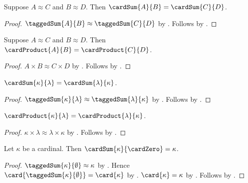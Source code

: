 \begin{proposition}\label{cardinal_sum_congruent}
    Suppose $A\approx C$ and $B\approx D$.
    Then $\cardSum{A}{B}=\cardSum{C}{D}$.
\end{proposition}
\begin{proof}
    $\taggedSum{A}{B}\approx\taggedSum{C}{D}$
        by .
    Follows by .
\end{proof}

\begin{proposition}\label{cardinal_product_congruent}
    Suppose $A\approx C$ and $B\approx D$.
    Then $\cardProduct{A}{B}=\cardProduct{C}{D}$.
\end{proposition}
\begin{proof}
    $A\times B\approx C\times D$ by .
    Follows by .
\end{proof}

\begin{proposition}\label{cardinal_sum_commutative}
    $\cardSum{\kappa}{\lambda}=\cardSum{\lambda}{\kappa}$.
\end{proposition}
\begin{proof}
    $\taggedSum{\kappa}{\lambda}\approx\taggedSum{\lambda}{\kappa}$
        by .
    Follows by .
\end{proof}

\begin{proposition}\label{cardinal_product_commutative}
    $\cardProduct{\kappa}{\lambda}=\cardProduct{\lambda}{\kappa}$.
\end{proposition}
\begin{proof}
    $\kappa\times\lambda\approx\lambda\times\kappa$
        by .
    Follows by .
\end{proof}

\begin{proposition}\label{cardinal_sum_zero_right}
    Let $\kappa$ be a cardinal.
    Then $\cardSum{\kappa}{\cardZero}=\kappa$.
\end{proposition}
\begin{proof}
    $\taggedSum{\kappa}{\emptyset}\approx\kappa$
        by .
    Hence $\card{\taggedSum{\kappa}{\emptyset}}=\card{\kappa}$
        by .
    $\card{\kappa}=\kappa$ by .
    Follows by .
\end{proof}

